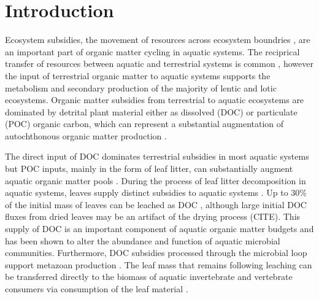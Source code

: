 \section{Introduction}
Ecosystem subsidies, the movement of resources across ecosystem boundries \cite{Polis_1997}, are an important part of organic matter cycling in aquatic systems. The reciprical transfer of resources between aquatic and terrestrial systems is common \cite{Nakano_2001}, however the input of terrestrial organic matter to aquatic systems supports the metabolism and secondary production of the majority of lentic and lotic ecosystems\cite{Marcarelli_2011}. Organic matter subsidies from terrestrial to aquatic ecosystems are dominated by detrital plant material either as dissolved (DOC) or particulate (POC) organic carbon, which can represent a substantial augmentation of autochthonous organic matter production \cite{Hodkinson_1975,GASITH_1976,wetzel_1984,WETZEL_1995,Webster_1997,Kobayashi_2011,Mehring_2014}.   

The direct input of DOC dominates terrestrial subsidies in most aquatic systems \cite{Rich_1978,wetzel_1984,CITE} but POC inputs, mainly in the form of leaf litter, can substantially augment aquatic organic matter pools \cite{Wetzel_1972,Hodkinson_1975,GASITH_1976,Rich_1978,Wallace_1999,Mehring_2014}. During the process of leaf litter decomposition in aquatic systems, leaves supply distinct subsidies to aquatic systems \cite{Gessner_1999,Marcarelli_2011}. Up to 30\% of the initial mass of leaves can be leached as DOC \cite{CITE,Meyer_1998,Duan_2014}, although large initial DOC fluxes from dried leaves may be an artifact of the drying process (CITE). This supply of DOC is an important component of aquatic organic matter budgets \cite{McDowell_1976,Karlsson_2007} and has been shown to alter the abundance \cite{Bott_1984,Fey_2015} and function \cite{MCCONNELL_1968} of aquatic microbial communities. Furthermore, DOC subsidies processed through the microbial loop support metazoan production \cite{Hall_1998,Wilcox_2005,Fey_2015b}.  The leaf mass that remains following leaching can be transferred directly to the biomass of aquatic invertebrate \cite{Wallace_1999,Kobayashi_2011} and vertebrate \cite{Rubbo_2008} consumers via consumption of the leaf material \cite{Gessner_1999}. 

